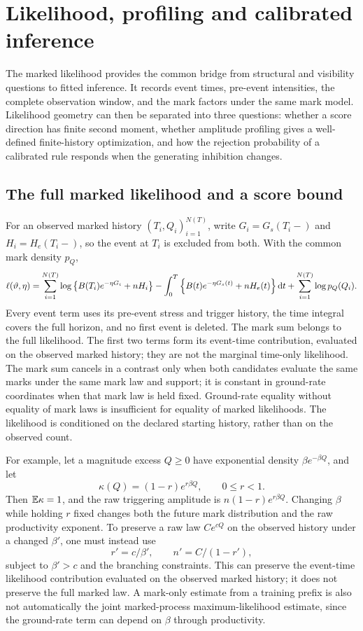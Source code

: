 \chapter{Likelihood, profiling and calibrated inference}\label{ch:inference}

The marked likelihood provides the common bridge from structural and visibility questions to fitted inference. It records event times, pre-event intensities, the complete observation window, and the mark factors under the same mark model. Likelihood geometry can then be separated into three questions: whether a score direction has finite second moment, whether amplitude profiling gives a well-defined finite-history optimization, and how the rejection probability of a calibrated rule responds when the generating inhibition changes.

\section{The full marked likelihood and a score bound}

For an observed marked history \((T_i,Q_i)_{i=1}^{N(T)}\), write \(G_i=G_s(T_i-)\) and \(H_i=H_e(T_i-)\), so the event at \(T_i\) is excluded from both. With the common mark density \(p_Q\),
\begin{equation}
\ell(\vartheta,\eta)
=
\sum_{i=1}^{N(T)}
\log\left\{B(T_i)e^{-\eta G_i}+nH_i\right\}
-\int_0^T\left\{B(t)e^{-\eta G_s(t)}+nH_e(t)\right\}\mathop{}\!\mathrm{d} t
+\sum_{i=1}^{N(T)}\log p_Q(Q_i).
\label{eq:full-likelihood}
\end{equation}
Every event term uses its pre-event stress and trigger history, the time integral covers the full horizon, and no first event is deleted. The mark sum belongs to the full likelihood. The first two terms form its event-time contribution, evaluated on the observed marked history; they are not the marginal time-only likelihood. The mark sum cancels in a contrast only when both candidates evaluate the same marks under the same mark law and support; it is constant in ground-rate coordinates when that mark law is held fixed. Ground-rate equality without equality of mark laws is insufficient for equality of marked likelihoods. The likelihood is conditioned on the declared starting history, rather than on the observed count.

For example, let a magnitude excess \(Q\ge0\) have exponential density \(\beta e^{-\beta Q}\), and let
\[
\kappa(Q)=(1-r)e^{r\beta Q},\qquad 0\le r<1.
\]
Then \(\mathbb{E} \kappa=1\), and the raw triggering amplitude is
\(n(1-r)e^{r\beta Q}\). Changing \(\beta\) while holding \(r\) fixed changes both the future mark distribution and the raw productivity exponent. To preserve a raw law \(C e^{cQ}\) on the observed history under a changed \(\beta'\), one must instead use
\[
r'=c/\beta',\qquad n'=C/(1-r'),
\]
subject to \(\beta'>c\) and the branching constraints. This can preserve the event-time likelihood contribution evaluated on the observed marked history; it does not preserve the full marked law. A mark-only estimate from a training prefix is also not automatically the joint marked-process maximum-likelihood estimate, since the ground-rate term can depend on \(\beta\) through productivity.

